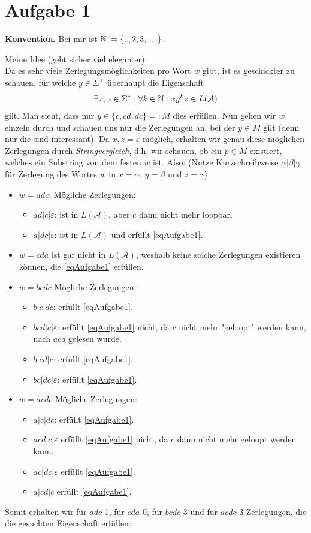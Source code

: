 \documentclass[12pt,a4paper]{article}
\newcommand{\A}{\mathcal{A}}
\begin{document}
\section*{Aufgabe 1}
\textbf{Konvention.} Bei mir ist $\mathbb{N}:=\lbrace 1,2,3,\ldots\rbrace$.\nl

Meine Idee (geht sicher viel eleganter):\\
Da es sehr viele Zerlegungsmöglichkeiten pro Wort $w$ gibt, ist es geschickter zu schauen, für welche $y\in\Sigma^+$ überhaupt die Eigenschaft 
\begin{align*}
	\exists x,z\in\Sigma^\ast:\forall k\in\N:xy^kz\in L(\A)
\end{align*}
gilt.
Man sieht, dass nur $y\in\lbrace c,cd,dc\rbrace=:M$ dies erfüllen. Nun gehen wir $w$ einzeln durch und schauen uns nur die Zerlegungen an, bei der $y\in M$ gilt (denn nur die sind interessant). Da $x,z=\varepsilon$ möglich, erhalten wir genau diese möglichen Zerlegungen durch \textit{Stringvergleich}, d.h. wir schauen, ob ein $p\in M$ existiert, welches ein Substring von dem festen $w$ ist. Also: (Nutze Kurzschreibweise $\alpha|\beta|\gamma$ für Zerlegung des Wortes $w$ in $x=\alpha$, $y=\beta$ und $z=\gamma$)
\begin{itemize}
	\item $w=adc$: Mögliche Zerlegungen: 
	\begin{itemize}
		\item $ad|c|\varepsilon$: ist in $L(\A)$, aber $c$ dann nicht mehr loopbar.
		\item $a|dc|\varepsilon$: ist in $L(\A)$ und erfüllt \eqref{eqAufgabe1}.
	\end{itemize}
	\item $w=cda$ ist gar nicht in $L(\A)$, weshalb keine solche Zerlegungen existieren können, die \eqref{eqAufgabe1} erfüllen. 
	\item $w=bcdc$ Mögliche Zerlegungen: 
	\begin{itemize}
		\item $b|c|dc$: erfüllt \eqref{eqAufgabe1}.
		\item $bcd|c|\varepsilon$: erfüllt \eqref{eqAufgabe1} nicht, da $c$ nicht mehr "geloopt" werden kann, nach $acd$ gelesen wurde.
		\item $b|cd|c$: erfüllt \eqref{eqAufgabe1}.
		\item $bc|dc|\varepsilon$: erfüllt \eqref{eqAufgabe1}.
	\end{itemize}
	\item $w=acdc$ Mögliche Zerlegungen: 
	\begin{itemize}
		\item $a|c|dc$: erfüllt \eqref{eqAufgabe1}.
		\item $acd|c|\varepsilon$ erfüllt \eqref{eqAufgabe1} nicht, da $c$ dann nicht mehr geloopt werden kann.
		\item $ac|dc|\varepsilon$ erfüllt \eqref{eqAufgabe1}.
		\item $a|cd|c$ erfüllt \eqref{eqAufgabe1}.
	\end{itemize}
\end{itemize}
Somit erhalten wir für $adc$ 1, für $cda$ 0, für $bcdc$ 3 und für $acdc$ 3 Zerlegungen, die die gesuchten Eigenschaft erfüllen:
\end{document}
